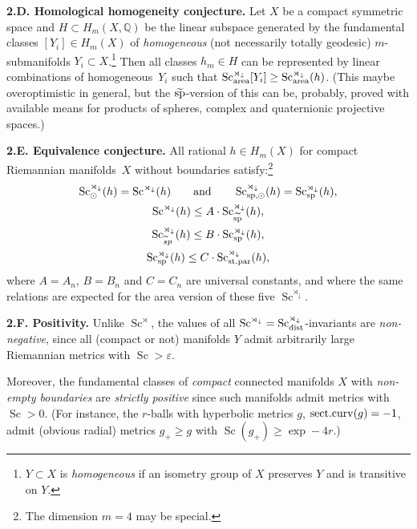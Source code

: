 \documentclass[10pt,a4paper]{amsart}
\numberwithin{equation}{section}
\begin{document}
\textbf{2.D. Homological homogeneity conjecture.}
 Let $X$ be a compact symmetric space
 and $H\subset H_ m(X, \mathbb Q)$ be the linear subspace generated by the fundamental classes
 $[Y_i]\in H_m(X)$ of {\it homogeneous} (not necessarily totally geodesic) $m$-submanifolds $Y_i\subset X$.\footnote{$Y\subset X$ is {\it homogeneous} if an isometry group of $X$ preserves $Y$ and is transitive on $Y$.}
Then all classes
 ${h_m\in H}$
 can be represented by linear combinations of homogeneous~$Y_i$ such that
 $\operatorname{Sc}^{\rtimes_\downarrow} _{\rm area}[Y_i]\geq \operatorname{Sc}^{\rtimes_\downarrow}_{\rm area}(h)$.
(This maybe overoptimistic in general, but the $\widetilde{\rm sp}$-version of this can be, probably, proved with available means for products of spheres, complex and quaternionic projective spaces.)

\textbf{2.E. Equivalence conjecture.} All rational $h\in H_m(X) $ for compact Riemannian manifolds~$X$ without boundaries
satisfy:\footnote{The dimension $m=4$ may be special.}
\begin{gather*}
 \operatorname{Sc}^{\rtimes_\downarrow}_\odot(h)=
\operatorname{Sc}^{\rtimes_\downarrow}(h)\qquad \text{and} \qquad \operatorname{Sc}^{\rtimes_\downarrow}_{{\rm sp},\odot}(h)=
\operatorname{Sc}^{\rtimes_\downarrow}_{\rm sp}(h),\\
\operatorname{Sc}^{\rtimes_\downarrow}(h)\leq
 A\cdot \operatorname{Sc}^{\rtimes_\downarrow} _{\widetilde {\rm sp}}(h),\\
\operatorname{Sc}^{\rtimes_\downarrow} _{{{\widetilde sp } }}(h)\leq B\cdot \operatorname{Sc}^{\rtimes_\downarrow} _{\rm sp}(h),\\
\operatorname{Sc}^{\rtimes_\downarrow} _{\rm sp}(h)\leq
C\cdot \operatorname{Sc}^{\rtimes_\downarrow} _{\rm st.par}(h),
\end{gather*}
where $A=A_n$, $B=B_n$ and $C=C_n$ are universal constants,
and where the same relations are expected for the area version of these five $\operatorname{Sc}^{\rtimes_\downarrow}$.

 \textbf {2.F. Positivity.} Unlike $\operatorname{Sc}^\rtimes$, the values of all $\operatorname{Sc}^{\rtimes_\downarrow}=\operatorname{Sc}_{\rm dist}^{\rtimes_\downarrow}$-invariants
 are {\it non-negative}, since all (compact or not) manifolds $Y$ admit arbitrarily large Riemannian metrics with $\operatorname{Sc}>\varepsilon$.

 Moreover, the fundamental classes of {\it compact} connected manifolds $X$ with {\it non-empty boundaries}
 are {\it strictly positive}
 since such manifolds admit metrics with $\operatorname{Sc}>0$.
 (For instance, the $r$-balls with hyperbolic metrics $g$, ${\rm sect.curv}(g)=-1$, admit (obvious radial) metrics $g_+\geq g$ with $\operatorname{Sc}(g_+)\geq \exp-4r$.)
\end{document}
